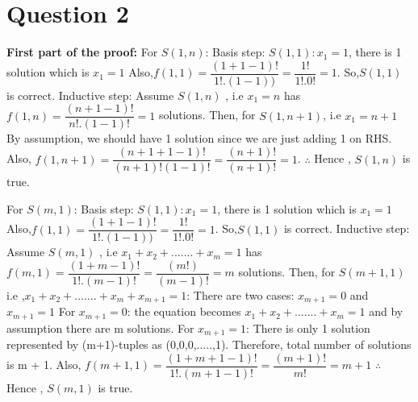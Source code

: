 \documentclass[11pt]{article}
\begin{document}
\section*{Question 2}
\noindent \textbf{First part of the proof:} \newline \newline
For $S(1,n)$: \newline \newline
Basis step: $S(1,1): x_1 = 1$, there is 1 solution which is $x_1 = 1$\newline
Also,$f(1,1) = \dfrac{(1+1-1)!}{1!.(1-1))} = \dfrac{1!}{1!.0!} = 1$. So,$S(1,1)$ is correct. \newline \newline
Inductive step: Assume $S(1,n)$ , i.e $x_1 = n$ has $f(1,n) = \dfrac{(n+1-1)!}{n!.(1-1)!} = 1$ solutions. \newline
Then, for $S(1,n+1)$, i.e $x_1 = n+1$ \newline By assumption, we should have 1
solution since we are just adding 1 on RHS. \newline
Also, $f(1,n+1) = \dfrac{(n+1+1-1)!}{(n+1)!(1-1)!} = \dfrac{(n+1)!}{(n+1)!} = 1$.\newline
$\therefore$ Hence , $S(1,n)$ is true. \newline \newline


\noindent For $S(m,1)$: \newline \newline
Basis step: $S(1,1): x_1 = 1$, there is 1 solution which is $x_1 = 1$\newline
Also,$f(1,1) = \dfrac{(1+1-1)!}{1!.(1-1))} = \dfrac{1!}{1!.0!} = 1$. So,$S(1,1)$ is correct. \newline \newline
Inductive step: Assume $S(m,1)$ , i.e $x_1 + x_2 + ....... + x_m = 1$ has 
$f(m,1) = \dfrac{(1+m-1)!}{1!.(m-1)!} = \dfrac{(m!)}{(m-1)!} = m$ solutions.\newline 
Then, for $S(m+1,1)$ i.e ,$x_1 + x_2 + ....... + x_m + x_{m+1}= 1$: \newline
There are two cases: $x_{m+1} = 0$ and $x_{m+1} = 1$ \newline \newline
For $x_{m+1} = 0$: the equation becomes $x_1 + x_2 + ....... + x_m = 1$ and by assumption there are m solutions. \newline
For $x_{m+1} = 1$: There is only 1 solution represented by (m+1)-tuples as (0,0,0,.....,1).\newline 
 \newline Therefore, total number of solutions is m + 1. \newline
Also, $f(m+1,1) = \dfrac{(1 + m + 1 - 1)!}{1!.(m+1-1)!} = \dfrac{(m+1)!}{m!} = m+1$ \newline
$\therefore$ Hence , $S(m,1)$ is true. \newline \newline \newline \newline
\end{document}
